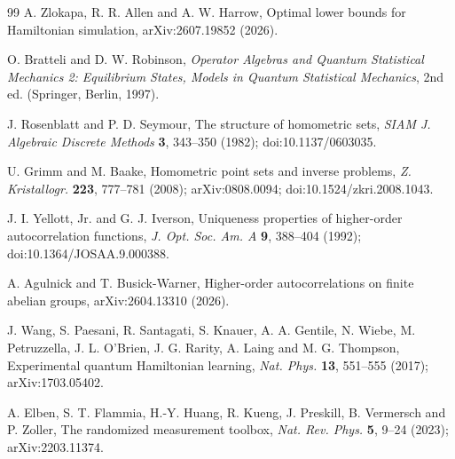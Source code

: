 \begin{thebibliography}{99}
A. Zlokapa, R. R. Allen and A. W. Harrow,
Optimal lower bounds for Hamiltonian simulation,
arXiv:2607.19852 (2026).

O. Bratteli and D. W. Robinson,
\emph{Operator Algebras and Quantum Statistical Mechanics 2: Equilibrium
States, Models in Quantum Statistical Mechanics}, 2nd ed.
(Springer, Berlin, 1997).

J. Rosenblatt and P. D. Seymour,
The structure of homometric sets,
\emph{SIAM J. Algebraic Discrete Methods} \textbf{3}, 343--350 (1982);
doi:10.1137/0603035.

U. Grimm and M. Baake,
Homometric point sets and inverse problems,
\emph{Z. Kristallogr.} \textbf{223}, 777--781 (2008);
arXiv:0808.0094; doi:10.1524/zkri.2008.1043.

J. I. Yellott, Jr. and G. J. Iverson,
Uniqueness properties of higher-order autocorrelation functions,
\emph{J. Opt. Soc. Am. A} \textbf{9}, 388--404 (1992);
doi:10.1364/JOSAA.9.000388.

A. Agulnick and T. Busick-Warner,
Higher-order autocorrelations on finite abelian groups,
arXiv:2604.13310 (2026).

J. Wang, S. Paesani, R. Santagati, S. Knauer, A. A. Gentile, N. Wiebe,
M. Petruzzella, J. L. O'Brien, J. G. Rarity, A. Laing and M. G. Thompson,
Experimental quantum Hamiltonian learning,
\emph{Nat. Phys.} \textbf{13}, 551--555 (2017);
arXiv:1703.05402.

A. Elben, S. T. Flammia, H.-Y. Huang, R. Kueng, J. Preskill,
B. Vermersch and P. Zoller,
The randomized measurement toolbox,
\emph{Nat. Rev. Phys.} \textbf{5}, 9--24 (2023);
arXiv:2203.11374.

\end{thebibliography}

